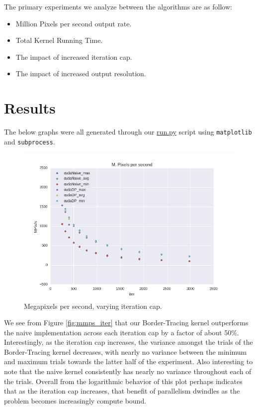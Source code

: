 \documentclass[letterpaper]{article}
\begin{document}
\begin{multicols}{2}
The primary experiments we analyze between the algorithms are as follow:

\begin{itemize}
  \item Million Pixels per second output rate.
  \item Total Kernel Running Time. 
  \item The impact of increased iteration cap.
  \item The impact of increased output resolution.
\end{itemize}

  \section{Results}

The below graphs were all generated through our \url{run.py} script using
  \texttt{matplotlib} and \texttt{subprocess}.

\begin{figure}[H]
  \includegraphics[width=\linewidth]{experiments3/mpps_graph_exp_iter.png}
  \caption{Megapixels per second, varying iteration cap.}
  \label{fig:mpps_iter}
\end{figure}

We see from Figure \ref{fig:mmps_iter} that our Border-Tracing kernel
  outperforms the naive implementation across each iteration cap by a factor of
  about 50\%. Interestingly, as the iteration cap increases, the variance
  amongst the trials of the Border-Tracing kernel decreases, with nearly no 
  variance between the minimum and maximum trials towards the latter half of the 
  experiment. Also interesting to note that the naive kernel consistently has
  nearly no variance throughout each of the trials. 
Overall from the logarithmic behavior of this plot perhaps indicates that as the
  iteration cap increases, that benefit of parallelism dwindles as the problem
  becomes increasingly compute bound.  


\end{multicols}
\end{document}
